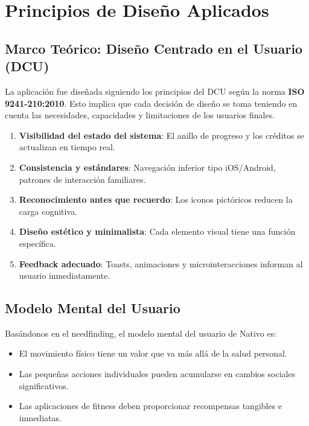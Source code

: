 \documentclass[12pt, a4paper]{article}
\begin{document}
\newpage
\section{Principios de Diseño Aplicados}

\subsection{Marco Teórico: Diseño Centrado en el Usuario (DCU)}

La aplicación fue diseñada siguiendo los principios del DCU según la norma \textbf{ISO 9241-210:2010}. Esto implica que cada decisión de diseño se toma teniendo en cuenta las necesidades, capacidades y limitaciones de los usuarios finales.

\begin{principiobox}
\begin{enumerate}[leftmargin=*, label=\textbf{N\arabic*.}, itemsep=4pt]
  \item \textbf{Visibilidad del estado del sistema}: El anillo de progreso y los créditos se actualizan en tiempo real.
  \item \textbf{Consistencia y estándares}: Navegación inferior tipo iOS/Android, patrones de interacción familiares.
  \item \textbf{Reconocimiento antes que recuerdo}: Los iconos pictóricos reducen la carga cognitiva.
  \item \textbf{Diseño estético y minimalista}: Cada elemento visual tiene una función específica.
  \item \textbf{Feedback adecuado}: Toasts, animaciones y microinteracciones informan al usuario inmediatamente.
\end{enumerate}
\end{principiobox}

\subsection{Modelo Mental del Usuario}

Basándonos en el needfinding, el modelo mental del usuario de Nativo es:

\begin{itemize}
  \item El movimiento físico tiene un valor que va más allá de la salud personal.
  \item Las pequeñas acciones individuales pueden acumularse en cambios sociales significativos.
  \item Las aplicaciones de fitness deben proporcionar recompensas tangibles e inmediatas.
\end{itemize}
\end{document}
